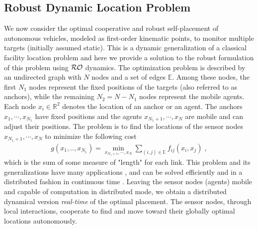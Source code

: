 \documentclass[journal,twoside,web]{ieeecolor}
\begin{document}
\subsection{Robust Dynamic Location Problem}
We now consider the optimal cooperative and robust self-placement of autonomous vehicles, modeled as first-order kinematic points, to monitor multiple targets (initially assumed static). This is a dynamic generalization of a classical facility location problem \cite{farahani2009} and here we provide a solution to the robust formulation of this problem using ${\cal RO}$ dynamics. The optimization problem is described by an undirected graph with $N$ nodes and a set of edges ${\mathbb E}$. Among these nodes, the first $N_1$ nodes represent the fixed positions of the targets (also referred to as anchors), while the remaining $N_2 = N - N_1$ nodes represent the mobile agents. Each node $x_i\in \mathbb{R}^2$ denotes the location of an anchor or an agent. The anchors $x_1,\cdots,x_{N_1}$ have fixed positions and the agents $x_{N_1+1},\cdots,x_{N}$ are mobile and can adjust their positions. The problem is to find the locations of the sensor nodes $x_{N_1+1},\cdots, x_N$ to minimize the following cost
\begin{align*}
g(x_1,..,x_{N_1})=\min_{x_{N_1+1},\cdots,x_N} \sum_{(i,j)\in {\mathbb E}}
f_{ij}(x_i, x_j)\;,
\end{align*}
which is the sum of some measure of "length" for each link. This problem and its generalizations have many applications \cite{boyd2004}, and can be solved efficiently and in a distributed fashion in continuous time \cite{wang2011}. Leaving the sensor nodes (agents) mobile and capable of computation in distributed mode, we obtain a distributed dynamical version \emph{real-time} of the optimal placement. The sensor nodes, through local interactions, cooperate to find and move toward their globally optimal locations autonomously.
\end{document}
